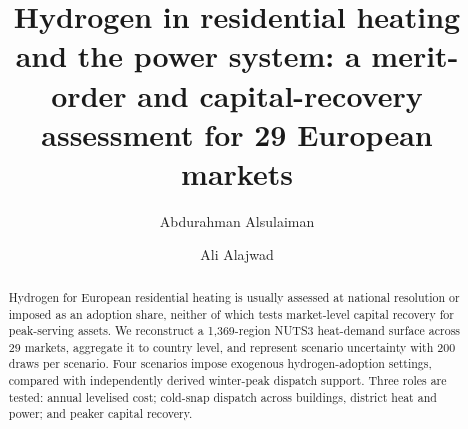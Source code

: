 \documentclass[review]{elsarticle}
\begin{document}
\begin{frontmatter}

\title{Hydrogen in residential heating and the power system: a merit-order and capital-recovery assessment for 29 European markets}

\author[leure]{Abdurahman Alsulaiman}
\author[jhu,cornell]{Ali Alajwad}

\begin{abstract}
Hydrogen for European residential heating is usually assessed at national resolution or imposed as an adoption share, neither of which tests market-level capital recovery for peak-serving assets. We reconstruct a 1{,}369-region NUTS3 heat-demand surface across 29 markets, aggregate it to country level, and represent scenario uncertainty with 200 draws per scenario. Four scenarios impose exogenous hydrogen-adoption settings, compared with independently derived winter-peak dispatch support. Three roles are tested: annual levelised cost; cold-snap dispatch across buildings, district heat and power; and peaker capital recovery.


\end{abstract}
\end{frontmatter}
\end{document}
